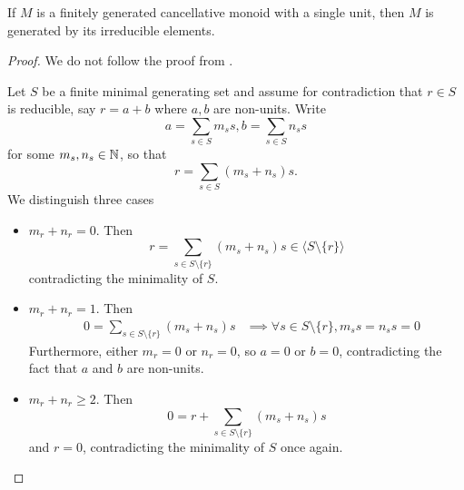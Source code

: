 \begin{proposition}
  \label{0-irred-gen}
  \leanok

  If $M$ is a finitely generated cancellative monoid with a single unit, then $M$ is generated by its irreducible elements.
\end{proposition}
\begin{proof}
  \uses{}

  We do not follow the proof from \cite{Cox_2011}.

  Let $S$ be a finite minimal generating set and assume for contradiction that $r \in S$ is reducible, say $r = a + b$ where $a, b$ are non-units. Write
  \[a = \sum_{s \in S} m_s s, b = \sum_{s \in S} n_s s\]
  for some $m_s, n_s \in {\mathbb N}$, so that
  \[r = \sum_{s \in S} (m_s + n_s) s.\]
  We distinguish three cases
  \begin{itemize}
    \item $m_r + n_r = 0$. Then
    \[r = \sum_{s \in S \setminus \{r\}} (m_s + n_s) s \in \langle S \setminus \{r\}\rangle\]
    contradicting the minimality of $S$.
    \item $m_r + n_r = 1$. Then
    \begin{align*}
      & 0 = \sum_{s \in S \setminus \{r\}} (m_s + n_s) s
      & \implies \forall s \in S \setminus \{r\}, m_s s = n_s s = 0
    \end{align*}
    Furthermore, either $m_r = 0$ or $n_r = 0$, so $a = 0$ or $b = 0$, contradicting the fact that $a$ and $b$ are non-units.
    \item $m_r + n_r \ge 2$. Then
    \[0 = r + \sum_{s \in S \setminus \{r\}} (m_s + n_s) s\]
    and $r = 0$, contradicting the minimality of $S$ once again.
  \end{itemize}
\end{proof}
